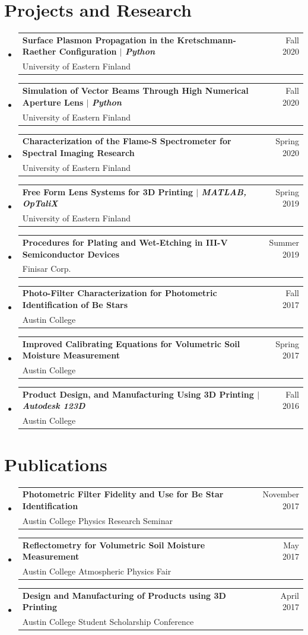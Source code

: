 \documentclass[A4,11pt]{article}
\makeatletter
\newcommand{\CVSubheading}[4]{
  \vspace{-2pt}\item
    \begin{tabular*}{0.97\textwidth}[t]{l@{\extracolsep{\fill}}r}
      \textbf{#1} & #2 \\
      \small#3 & \small #4 \\
    \end{tabular*}\vspace{-7pt}
}
\newcommand{\CVSubHeadingListStart}{\begin{itemize}[leftmargin=0.5cm, label={}]}
\newcommand{\CVSubHeadingListEnd}{\end{itemize}}
\makeatother
\begin{document}

\section{Projects and Research}
  \CVSubHeadingListStart
    \CVSubheading
      {{Surface Plasmon Propagation in the Kretschmann-Raether Configuration} $|$ \emph{\small{Python}}}{Fall 2020}
      {University of Eastern Finland}{}
    \CVSubheading
      {{Simulation of Vector Beams Through High Numerical Aperture Lens} $|$ \emph{\small{Python}}}{Fall 2020}
      {University of Eastern Finland}{}
    \CVSubheading
      {Characterization of the Flame-S Spectrometer for Spectral Imaging Research}{Spring 2020}
      {University of Eastern Finland}{}
    \CVSubheading
      {{Free Form Lens Systems for 3D Printing} $|$ \emph{\small{MATLAB, OpTaliX}}}{Spring 2019}
      {University of Eastern Finland}{}
    \CVSubheading
      {Procedures for Plating and Wet-Etching in III-V Semiconductor Devices}{Summer 2019}
      {Finisar Corp.}{}
    \CVSubheading
      {Photo-Filter Characterization for Photometric Identification of Be Stars}{Fall 2017}
      {Austin College}{}
    \CVSubheading
      {Improved Calibrating Equations for Volumetric Soil Moisture Measurement}{Spring 2017}
      {Austin College}{}
    \CVSubheading
      {{Product Design, and Manufacturing Using 3D Printing} $|$ \emph{\small{Autodesk 123D}}}{Fall 2016}
      {Austin College}{}
  \CVSubHeadingListEnd

\section{Publications}
  \CVSubHeadingListStart
    \CVSubheading
      {Photometric Filter Fidelity and Use for Be Star Identification}{November 2017}
      {Austin College Physics Research Seminar}{}
    \CVSubheading
      {Reflectometry for Volumetric Soil Moisture Measurement}{May 2017}
      {Austin College Atmospheric Physics Fair}{}
    \CVSubheading
      {Design and Manufacturing of Products using 3D Printing}{April 2017}
      {Austin College Student Scholarship Conference}{}
  \CVSubHeadingListEnd
\end{document}
